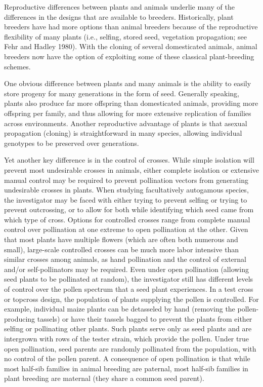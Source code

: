 \documentclass{article}
\begin{document}
Reproductive differences between plants and animals underlie many of the differences in the designs that are available to breeders. Historically, plant breeders have had more options than animal breeders because of the reproductive flexibility of many plants (i.e., selfing, stored seed, vegetation propagation; see Fehr and Hadley 1980). With the cloning of several domesticated animals, animal breeders now have the option of exploiting some of these classical plant-breeding schemes.

One obvious difference between plants and many animals is the ability to easily store progeny for many generations in the form of seed. Generally speaking, plants also produce far more offspring than domesticated animals, providing more offspring per family, and thus allowing for more extensive replication of families across environments. Another reproductive advantage of plants is that asexual propagation (cloning) is straightforward in many species, allowing individual genotypes to be preserved over generations.

Yet another key difference is in the control of crosses. While simple isolation will prevent most undesirable crosses in animals, either complete isolation or extensive manual control may be required to prevent pollination vectors from generating undesirable crosses in plants. When studying facultatively autogamous species, the investigator may be faced with either trying to prevent selfing or trying to prevent outcrossing, or to allow for both while identifying which seed came from which type of cross. Options for controlled crosses range from complete manual control over pollination at one extreme to open pollination at the other. Given that most plants have multiple flowers (which are often both numerous and small), large-scale controlled crosses can be much more labor intensive than similar crosses among animals, as hand pollination and the control of external and/or self-pollinators may be required. Even under open pollination (allowing seed plants to be pollinated at random), the investigator still has different levels of control over the pollen spectrum that a seed plant experiences. In a test cross or topcross design, the population of plants supplying the pollen is controlled. For example, individual maize plants can be detasseled by hand (removing the pollen-producing tassels) or have their tassels bagged to prevent the plants from either selfing or pollinating other plants. Such plants serve only as seed plants and are intergrown with rows of the tester strain, which provide the pollen. Under true open pollination, seed parents are randomly pollinated from the population, with no control of the pollen parent. A consequence of open pollination is that while most half-sib families in animal breeding are paternal, most half-sib families in plant breeding are maternal (they share a common seed parent).
\end{document}
